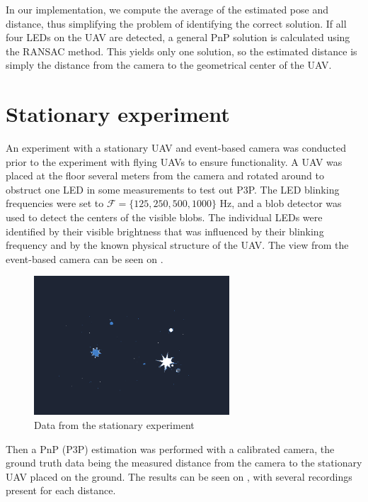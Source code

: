 In our implementation, we compute the average of the estimated pose and distance, thus simplifying the problem of identifying the correct solution. If all four \ac{LED}s on the \ac{UAV} are detected, a general \ac{PnP} solution is calculated using the \ac{RANSAC} method. This yields only one solution, so the
estimated distance is simply the distance from the camera to the geometrical center of the \ac{UAV}.

\section{Stationary experiment}
An experiment with a stationary \ac{UAV} and event-based camera was conducted prior to the experiment with flying \ac{UAV}s to ensure functionality.
A \ac{UAV} was placed at the floor several meters from the camera and rotated around to obstruct one \ac{LED} in some measurements to test out \ac{P3P}. The LED blinking frequencies were set to $\mathcal{F} = \{125, 250, 500, 1000\}$ Hz, and a blob detector was used to detect the centers of the visible blobs. The individual \ac{LED}s were identified by their visible brightness that was influenced by their blinking frequency and by the known physical structure of the \ac{UAV}. The view from the event-based camera can be seen on .
\begin{figure}[H]
	\centering
	\includegraphics[width=0.65\textwidth]{./fig/photos/pnpmeas.png}
	\caption{Data from the stationary experiment}
	\label{fig:pnpuav}
\end{figure}
Then a \ac{PnP} (\ac{P3P}) estimation was performed with a calibrated camera, the ground truth data being the measured distance from the camera to the
stationary \ac{UAV} placed on the ground.
The results can be seen on , with several recordings
present for each distance.
